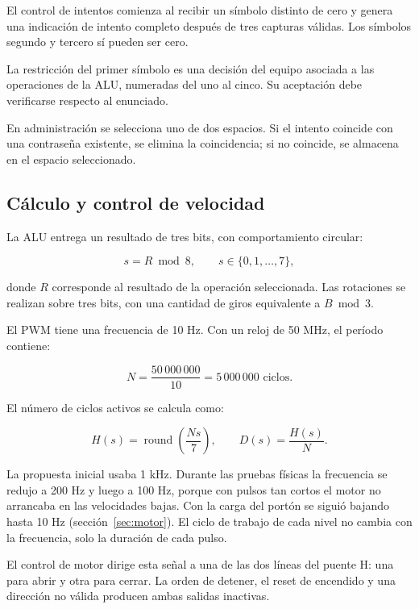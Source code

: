 \documentclass[12pt,letterpaper]{article}
\begin{document}
El control de intentos comienza al recibir un símbolo
distinto de cero y genera una indicación de intento
completo después de tres capturas válidas. Los símbolos
segundo y tercero sí pueden ser cero.

La restricción del primer símbolo es una decisión del
equipo asociada a las operaciones de la ALU, numeradas
del uno al cinco. Su aceptación debe verificarse respecto
al enunciado.

En administración se selecciona uno de dos espacios.
Si el intento coincide con una contraseña existente,
se elimina la coincidencia; si no coincide, se almacena
en el espacio seleccionado.

\subsection{Cálculo y control de velocidad}

La ALU entrega un resultado de tres bits, con
comportamiento circular:

\begin{equation}
s = R \bmod 8,
\qquad s \in \{0,1,\ldots,7\},
\end{equation}

donde $R$ corresponde al resultado de la operación
seleccionada. Las rotaciones se realizan sobre tres bits,
con una cantidad de giros equivalente a $B \bmod 3$.

El PWM tiene una frecuencia de 10 Hz. Con un reloj
de 50 MHz, el período contiene:

\begin{equation}
N=\frac{50\,000\,000}{10}=5\,000\,000
\text{ ciclos}.
\end{equation}

El número de ciclos activos se calcula como:

\begin{equation}
H(s)=\operatorname{round}\left(\frac{Ns}{7}\right),
\qquad
D(s)=\frac{H(s)}{N}.
\end{equation}

La propuesta inicial usaba 1 kHz. Durante las pruebas
físicas la frecuencia se redujo a 200 Hz y luego a
100 Hz, porque con pulsos tan cortos el motor no
arrancaba en las velocidades bajas. Con la carga del
portón se siguió bajando hasta 10 Hz
(sección~\ref{sec:motor}). El ciclo de trabajo de cada
nivel no cambia con la frecuencia, solo la duración de
cada pulso.

El control de motor dirige esta señal a una de las dos
líneas del puente H: una para abrir y otra para cerrar.
La orden de detener, el reset de encendido y una dirección
no válida producen ambas salidas inactivas.
\end{document}
